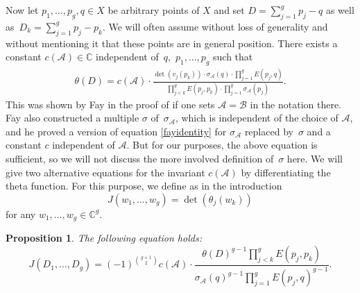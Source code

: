 \documentclass[pdftex]{sigma}
\numberwithin{equation}{section}
\newtheorem{Proposition}[Theorem]{Proposition}
 { \theoremstyle{definition}
\newtheorem{Definition}[Theorem]{Definition}
\newtheorem{Note}[Theorem]{Note}
\newtheorem{Example}[Theorem]{Example}
\newtheorem{Remark}[Theorem]{Remark} }
\begin{document}
Now let $p_1,\dots,p_g,q\in X$ be arbitrary points of $X$ and set $D=\sum_{j=1}^gp_j-q$ as well as~${D_k=\sum_{j=1}^gp_j-p_k}$.
We will often assume without loss of generality and without mentioning it that these points are in general position.
There exists a constant $c(\mathcal{A})\in \mathbb{C}$ independent of~$q$,~$p_1,\dots, p_g$ such that
\begin{align}\label{fayidentity}
	\theta(D)=c(\mathcal{A})\cdot\frac{\det(v_j(p_k))\cdot\sigma_{\mathcal{A}}(q)\cdot \prod_{j=1}^g E(p_j,q)}{\prod_{j<k}^{g}E(p_j,p_k)\cdot\prod_{j=1}^g\sigma_{\mathcal{A}}(p_j)}.
\end{align}
This was shown by Fay in the proof of \cite[Corollary 2.17]{Fay73} if one sets $\mathcal{A}=\mathcal{B}$ in the notation there. Fay also constructed a multiple $\sigma$ of~$\sigma_{\mathcal{A}}$, which is independent of the choice of $\mathcal{A}$, and he proved a version of equation \eqref{fayidentity} for $\sigma_{\mathcal{A}}$ replaced by~$\sigma$ and a constant $c$ independent of $\mathcal{A}$. But for our purposes, the above equation is sufficient, so we will not discuss the more involved definition of~$\sigma$ here.
We will give two alternative equations for the invariant $c(\mathcal{A})$ by differentiating the theta function. For this purpose, we define as in the introduction
\[J(w_1,\dots,w_g)=\det(\theta_j(w_k))\]
for any $w_1,\dots,w_g\in\mathbb{C}^g$.
\begin{Proposition}\label{propJ}
	The following equation holds:
	\[
J(D_1,\dots,D_g)=(-1)^{\binom{g+1}{2}} c(\mathcal{A})\cdot\frac{\theta(D)^{g-1}\prod_{j<k}^g E(p_j,p_k)}{\sigma_{\mathcal{A}}(q)^{g-1}\prod_{j=1}^g E(p_j,q)^{g-1}}.\]
\end{Proposition}
\end{document}
